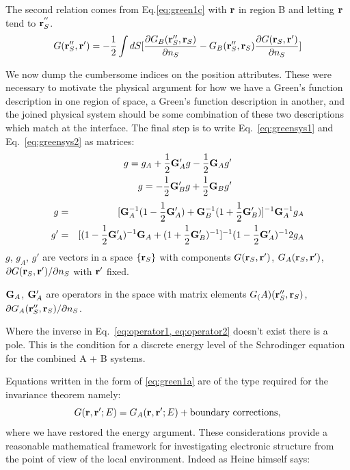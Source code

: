 The second relation comes from Eq.\ref{eq:green1c} with 
${\bf r}$ in region B and letting ${\bf r}$ tend to ${\bf r}^{''}_{S}$.
%
\begin{equation}
\label{eq:greensys2}
G({\bf r}''_{S}, {\bf r}') = -\frac{1}{2}\int dS [\frac{\partial G_{B}({\bf r}''_{S}, {\bf r}_{S})}{\partial n_{S}}
-G_{B}({\bf r}''_{S},{\bf r}_{S})\frac{\partial G({\bf r}_{S},{\bf r}')}{\partial n_{S}}]
\end{equation}
%

We now dump the cumbersome indices on the position attributes. These
were necessary to motivate the physical argument for how we have a Green's function
description in one region of space, a Green's function description in another, 
and the joined physical system should be some combination of these two descriptions
which match at the interface. The final step is to write Eq.~\ref{eq:greensys1} 
and Eq.~\ref{eq:greensys2} as matrices:
%
\begin{align}
\label{eq:operator1}
g = g_{A} + \frac{1}{2}{\bf G}'_{A}g - \frac{1}{2}{\bf G}_{A}g' \\
g = -\frac{1}{2}{\bf G}'_{B}g + \frac{1}{2}{\bf G}_{B}g' \\
\end{align}
%
\begin{align}
\label{eq:operator2}
g & = & [{\bf G}^{-1}_{A}(1-\frac{1}{2}{\bf G}'_{A}) + {\bf G}^{-1}_{B}(1+\frac{1}{2}{\bf G}'_{B})]^{-1} {\bf G}^{-1}_{A}g_{A} \\
g' & = & [(1-\frac{1}{2}{\bf G}'_{A})^{-1}{\bf G}_{A} + (1+\frac{1}{2}{\bf G}'_{B})^{-1}]^{-1}(1 - \frac{1}{2}{\bf G}'_{A})^{-1}2g_{A}
\end{align}
%
$g$, $g_{A}$, $g'$ are vectors in a space $\{{\bf r}_{S}\}$ with components $G({\bf r}_{S},{\bf r}')$,
$G_{A}({\bf r}_{S},{\bf r}')$, $\partial G({\bf r}_{S},{\bf r}')/\partial n_{S}$ with ${\bf r}'$ fixed.

${\bf G}_{A}$, ${\bf G}'_{A}$ are operators in the space with matrix elements
$G_(A)({\bf r}''_{S}, {\bf r}_{S})$, $\partial G_{A}({\bf r}''_{S}, {\bf r}_{S})/\partial n_{S}$.

Where the inverse in Eq.~\ref{eq:operator1, eq:operator2} 
doesn't exist there is a pole. This is the condition for a discrete energy level 
of the Schrodinger equation for the combined A + B systems. 

Equations written in the form of \ref{eq:green1a} are of the type required for the invariance theorem namely:
%
\begin{equation}
G({\bf r},{\bf r}';E) = G_{A}({\bf r},{\bf r}';E) + {\rm boundary ~ corrections},
\end{equation}
%
where we have restored the energy argument.
These considerations provide a reasonable mathematical framework for 
investigating electronic structure from the point of view of the local environment.
Indeed as Heine himself says: 

